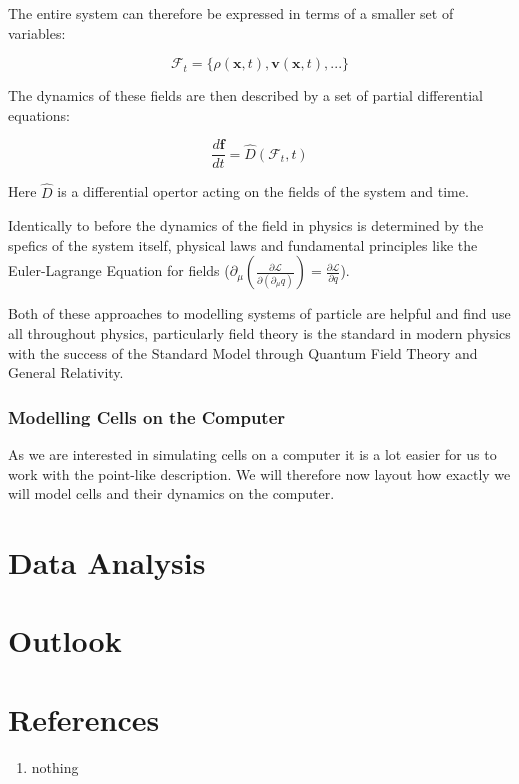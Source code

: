 \documentclass[11pt]{article}
\begin{document}
\newpage

The entire system can therefore be expressed in terms of a smaller set of variables: 


\begin{equation}
    \label{field-set}
    \mathcal{F}_t = \{\rho(\bm{x}, t), \bm{v}(\bm{x}, t), ... \}
\end{equation}

The dynamics of these fields are then described by a set of partial differential equations:


\begin{equation}
    \label{field-pde}
    \frac{d \bm{f}}{dt} = \hat{D} (\mathcal{F}_t, t)
\end{equation}

Here $\hat{D}$ is a differential opertor acting on the fields of the system and time. \par

\vspace{4mm}

Identically to before the dynamics of the field in physics is determined by the spefics of the system itself, physical laws and fundamental principles like the Euler-Lagrange Equation for fields ($\partial_\mu \left( \frac{\partial \mathcal{L}}{\partial (\partial_\mu q)} \right)= \frac{\partial \mathcal{L}}{\partial q}$).

\vspace{4mm}

Both of these approaches to modelling systems of particle are helpful and find use all throughout physics, particularly field theory is the standard in modern physics with the success of the Standard Model through Quantum Field Theory and General Relativity. \par

\subsubsection*{Modelling Cells on the Computer}

As we are interested in simulating cells on a computer it is a lot easier for us to work with the point-like description. We will therefore now layout how exactly we will model cells and their dynamics on the computer. \par

\vspace{4mm}



\newpage

\section{Data Analysis}

\newpage

\section{Outlook}

\renewcommand{\labelenumi}{[\theenumi]}

\section*{References}
\begin{enumerate}
    \item nothing
\end{enumerate}
\end{document}
